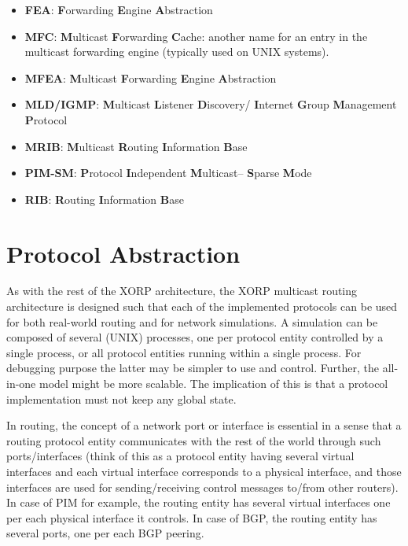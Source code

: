 \documentclass[11pt]{article}
\begin{document}
\begin{itemize}

  \item {\bf FEA}: {\bf F}orwarding {\bf E}ngine {\bf A}bstraction

  \item {\bf MFC}: {\bf M}ulticast {\bf F}orwarding {\bf C}ache: another
  name for an entry in the multicast forwarding engine (typically used
  on UNIX systems).

  \item {\bf MFEA}: {\bf M}ulticast {\bf F}orwarding {\bf E}ngine
  {\bf A}bstraction

  \item {\bf MLD/IGMP}: {\bf M}ulticast {\bf L}istener {\bf D}iscovery/{\bf
  I}nternet {\bf G}roup {\bf M}anagement {\bf P}rotocol

  \item {\bf MRIB}: {\bf M}ulticast {\bf R}outing {\bf I}nformation
  {\bf B}ase

  \item {\bf PIM-SM}: {\bf P}rotocol {\bf I}ndependent {\bf M}ulticast--{\bf
  S}parse {\bf M}ode

  \item {\bf RIB}: {\bf R}outing {\bf I}nformation {\bf B}ase

\end{itemize}


\section{Protocol Abstraction}

As with the rest of the XORP architecture, the XORP multicast routing
architecture is designed such that each of the implemented protocols
can be used for both real-world routing and for network simulations.  A
simulation can be composed of several (UNIX) processes, one per
protocol entity controlled by a single process, or all protocol entities
running within a single process. For debugging purpose the latter may be
simpler to use and control. Further, the all-in-one model might be more
scalable. The implication of this is that a protocol implementation
must not keep any global state.

In routing, the concept of a network port or interface is essential in a
sense that a routing protocol entity communicates with the rest of the
world through such ports/interfaces (think of this as a protocol entity
having several virtual interfaces and each virtual interface corresponds
to a physical interface, and those interfaces are used for
sending/receiving control messages to/from other routers). In case of
PIM for example, the routing entity has several virtual interfaces one
per each physical interface it controls.  In case of BGP,
the routing entity has several ports, one per each BGP peering.
\end{document}
